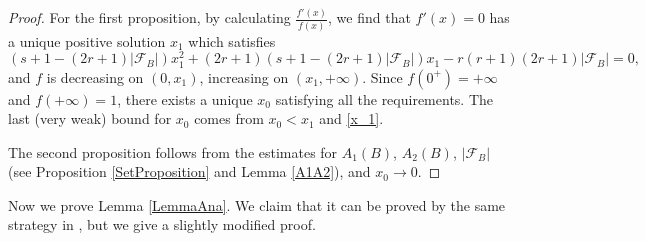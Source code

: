 \documentclass[11pt]{amsart}
\numberwithin{equation}{section}
\begin{document}
\begin{proof}
For the first proposition, by calculating $\frac{f'(x)}{f(x)}$, we find that $f'(x) = 0$ has a unique positive solution $x_1$ which satisfies
\begin{equation}\label{x_1}
(s+1-(2r+1)|\mathcal{F}_B|)x_1^2 + (2r+1)(s+1-(2r+1)|\mathcal{F}_B|)x_1 - r(r+1)(2r+1)|\mathcal{F}_B| = 0,
\end{equation}
and $f$ is decreasing on $(0,x_1)$, increasing on $(x_1,+\infty)$. Since $f(0^{+}) = +\infty$ and $f(+\infty) = 1$, there exists a unique $x_0$ satisfying all the requirements. The last (very weak) bound for $x_0$ comes from $x_0 < x_1$ and \eqref{x_1}.

The second proposition follows from the estimates for $A_1(B)$, $A_2(B)$, $|\mathcal{F}_B|$ (see Proposition \ref{SetProposition} and Lemma \ref{A1A2}), and $x_0 \rightarrow 0$.
\end{proof}
\smallskip

Now we prove Lemma \ref{LemmaAna}. We claim that it can be proved by the same strategy in \cite[Lemma 3]{FSZ2019}, but we give a slightly modified proof.
\end{document}
